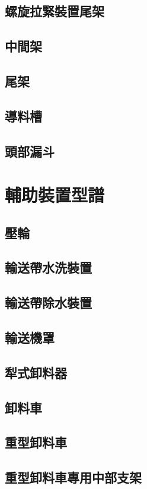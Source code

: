 \documentclass[UTF8]{ctexart}
\begin{document}
\subsection{螺旋拉緊裝置尾架}
\subsection{中間架}
\subsection{尾架}
\subsection{導料槽}
\subsection{頭部漏斗}


\newpage
\section{輔助裝置型譜}
\subsection{壓輪}
\subsection{輸送帶水洗裝置}
\subsection{輸送帶除水裝置}
\subsection{輸送機罩}
\subsection{犁式卸料器}
\subsection{卸料車}
\subsection{重型卸料車}
\subsection{重型卸料車專用中部支架}
\end{document}
